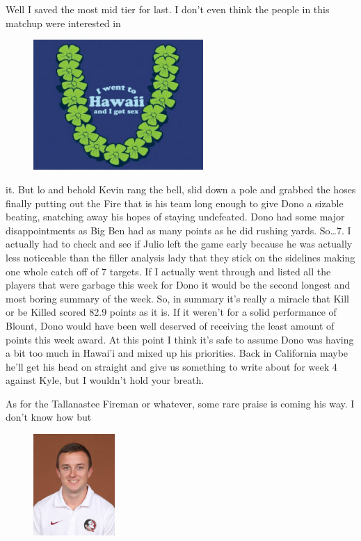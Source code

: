 \documentclass[11pt,letterpaper]{article}
\begin{document}
\newpage
{}
\par\noindent Well I saved the most mid tier for last. I don't even think the people in this matchup were interested in 
\begin{figure}
\centering
\includegraphics[width=0.575\textwidth]{week3-hawaii.png}
\label{fig:week3-hawaii}
\end{figure} 
\par\noindent it. But lo and behold Kevin rang the bell, slid down a pole and grabbed the hoses finally putting out the Fire that is his team long enough to give Dono a sizable beating, snatching away his hopes of staying undefeated. Dono had some major disappointments as Big Ben had as many points as he did rushing yards. So\dots 7. I actually had to check and see if Julio left the game early because he was actually less noticeable than the filler analysis lady that they stick on the sidelines making one whole catch off of 7 targets. If I actually went through and listed all the players that were garbage this week for Dono it would be the second longest and most boring summary of the week. So, in summary it's really a miracle that Kill or be Killed scored 82.9 points as it is. If it weren't for a solid performance of Blount, Dono would have been well deserved of receiving the least amount of points this week award. At this point I think it's safe to assume Dono was having a bit too much in Hawai'i and mixed up his priorities. Back in California maybe he'll get his head on straight and give us something to write about for week 4 against Kyle, but I wouldn't hold your breath. 
\bigskip
\par\noindent As for the Tallanastee Fireman or whatever, some rare praise is coming his way. I don't know how but  
\begin{figure}
\centering
\includegraphics[width=0.275\textwidth]{week3-kevin.png}
\label{fig:week3-kevin}
\end{figure} 
\end{document}
